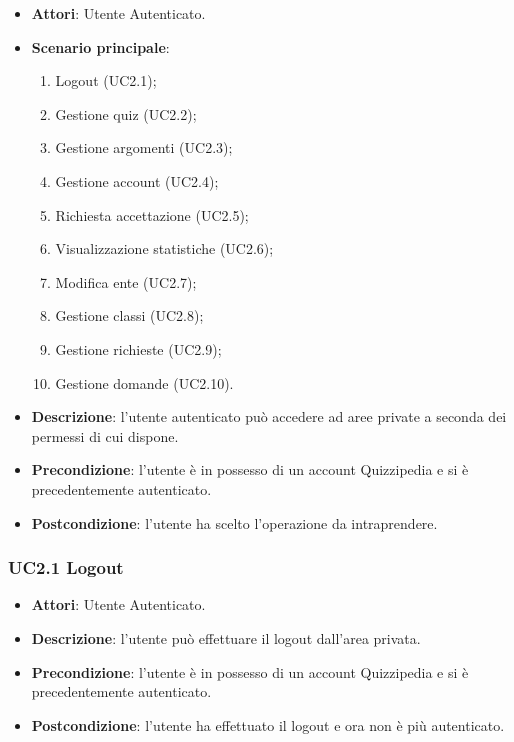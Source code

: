\begin{itemize}
\item \textbf{Attori}: Utente Autenticato.
\item \textbf{Scenario principale}:
\begin{enumerate}
\item Logout (UC2.1);
\item Gestione quiz (UC2.2);
\item Gestione argomenti (UC2.3);
\item Gestione account (UC2.4);
\item Richiesta accettazione (UC2.5);
\item Visualizzazione statistiche (UC2.6);
\item Modifica ente (UC2.7);
\item Gestione classi (UC2.8);
\item Gestione richieste (UC2.9);
\item Gestione domande (UC2.10).
\end{enumerate}
\item \textbf{Descrizione}: l'utente autenticato può accedere ad aree private a seconda dei permessi di cui dispone.
\item \textbf{Precondizione}: l'utente è in possesso di un account Quizzipedia e si è precedentemente autenticato.
\item \textbf{Postcondizione}: l'utente ha scelto l'operazione da intraprendere.
\end{itemize}
\subsubsection{UC2.1 Logout}
\begin{itemize}
\item \textbf{Attori}: Utente Autenticato.
\item \textbf{Descrizione}: l’utente può effettuare il logout dall’area privata.
\item \textbf{Precondizione}: l’utente è in possesso di un account Quizzipedia e si è precedentemente autenticato.
\item \textbf{Postcondizione}: l’utente ha effettuato il logout e ora non è più autenticato.
\end{itemize}
